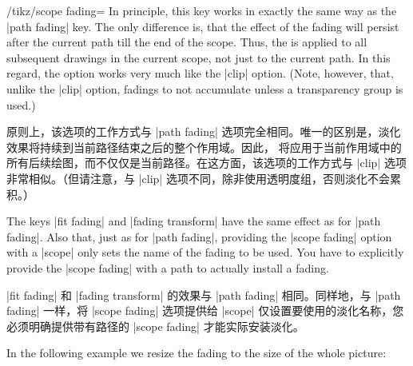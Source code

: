\begin{key}{/tikz/scope fading=}
    In principle, this key works in exactly the same way as the |path fading|
    key. The only difference is, that the effect of the fading will persist
    after the current path till the end of the scope. Thus, the 
    is applied to all subsequent drawings in the current scope, not just to the
    current path. In this regard, the option works very much like the |clip|
    option. (Note, however, that, unlike the |clip| option, fadings to not
    accumulate unless a transparency group is used.)

    原则上，该选项的工作方式与 |path fading| 选项完全相同。唯一的区别是，淡化效果将持续到当前路径结束之后的整个作用域。因此， 将应用于当前作用域中的所有后续绘图，而不仅仅是当前路径。在这方面，该选项的工作方式与 |clip| 选项非常相似。（但请注意，与 |clip| 选项不同，除非使用透明度组，否则淡化不会累积。）

    The keys |fit fading| and |fading transform| have the same effect as for
    |path fading|. Also that, just as for |path fading|, providing the
    |scope fading| option with a |{scope}| only sets the name of the fading to
    be used. You have to explicitly provide the |scope fading| with a path to
    actually install a fading.

    |fit fading| 和 |fading transform| 的效果与 |path fading| 相同。同样地，与 |path fading| 一样，将 |scope fading| 选项提供给 |{scope}| 仅设置要使用的淡化名称，您必须明确提供带有路径的 |scope fading| 才能实际安装淡化。


\begin{codeexample}[preamble={\usetikzlibrary{fadings,patterns}}]
\end{codeexample}

    In the following example we resize the fading to the size of the whole
    picture:


\end{key}
